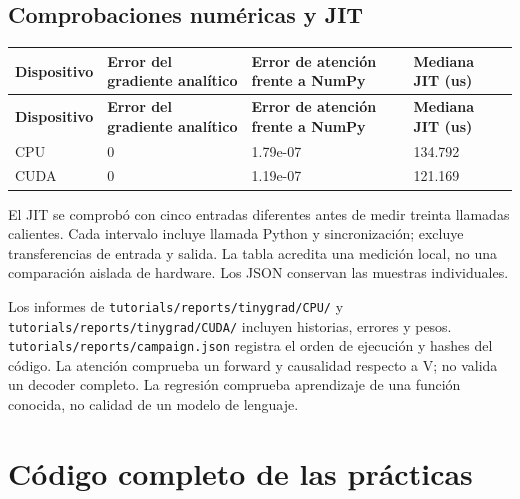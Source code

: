 \documentclass[12pt,a4paper,oneside]{report}
\begin{document}
\section{Comprobaciones numéricas y JIT}
{\small
\begin{longtable}{@{}P{0.22\textwidth}P{0.23\textwidth}P{0.23\textwidth}P{0.23\textwidth}@{}}
\toprule
\textbf{Dispositivo} & \textbf{Error del gradiente analítico} & \textbf{Error de atención frente a NumPy} & \textbf{Mediana JIT (us)}\\
\midrule
\endfirsthead
\toprule
\textbf{Dispositivo} & \textbf{Error del gradiente analítico} & \textbf{Error de atención frente a NumPy} & \textbf{Mediana JIT (us)}\\
\midrule
\endhead
CPU & 0 & 1.79e-07 & 134.792\\
CUDA & 0 & 1.19e-07 & 121.169\\
\bottomrule
\end{longtable}
}
El JIT se comprobó con cinco entradas diferentes antes de medir treinta llamadas calientes. Cada intervalo incluye llamada Python y sincronización; excluye transferencias de entrada y salida. La tabla acredita una medición local, no una comparación aislada de hardware. Los JSON conservan las muestras individuales.

Los informes de \texttt{tutorials/re\allowbreak{}ports/tinygr\allowbreak{}ad/CPU/} y \texttt{tutorials/re\allowbreak{}ports/tinygr\allowbreak{}ad/CUDA/} incluyen historias, errores y pesos. \texttt{tutorials/re\allowbreak{}ports/campai\allowbreak{}gn.json} registra el orden de ejecución y hashes del código. La atención comprueba un forward y causalidad respecto a V; no valida un decoder completo. La regresión comprueba aprendizaje de una función conocida, no calidad de un modelo de lenguaje.

\clearpage\appendix\chapter{Código completo de las prácticas}
\end{document}
